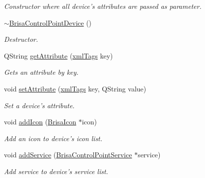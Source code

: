 \begin{DoxyCompactItemize}
\begin{DoxyCompactList}\small\item\em Constructor where all device's attributes are passed as parameter. \item\end{DoxyCompactList}\item 
\hyperlink{classBrisaUpnp_1_1BrisaControlPointDevice_a9d8a0f7c9cb57974ac8cf7ac88f82f81}{$\sim$BrisaControlPointDevice} ()
\begin{DoxyCompactList}\small\item\em Destructor. \item\end{DoxyCompactList}\item 
QString \hyperlink{classBrisaUpnp_1_1BrisaControlPointDevice_abf003df30a29358730a723fa36dfa3fd}{getAttribute} (\hyperlink{classBrisaUpnp_1_1BrisaControlPointDevice_a8aaeeda62adcdbd531f5a14bb52c1739}{xmlTags} key)
\begin{DoxyCompactList}\small\item\em Gets an attribute by key. \item\end{DoxyCompactList}\item 
void \hyperlink{classBrisaUpnp_1_1BrisaControlPointDevice_ab0922df951a94339f371b285c04eabac}{setAttribute} (\hyperlink{classBrisaUpnp_1_1BrisaControlPointDevice_a8aaeeda62adcdbd531f5a14bb52c1739}{xmlTags} key, QString value)
\begin{DoxyCompactList}\small\item\em Set a device's attribute. \item\end{DoxyCompactList}\item 
void \hyperlink{classBrisaUpnp_1_1BrisaControlPointDevice_afd25b6a2446a81820f271170251873ff}{addIcon} (\hyperlink{classBrisaUpnp_1_1BrisaIcon}{BrisaIcon} $\ast$icon)
\begin{DoxyCompactList}\small\item\em Add an icon to device's icon list. \item\end{DoxyCompactList}\item 
void \hyperlink{classBrisaUpnp_1_1BrisaControlPointDevice_a8951736e30cad71d0e2e978fa20024f8}{addService} (\hyperlink{classBrisaUpnp_1_1BrisaControlPointService}{BrisaControlPointService} $\ast$service)
\begin{DoxyCompactList}\small\item\em Add service to device's service list. \item\end{DoxyCompactList}\item 

\end{DoxyCompactItemize}

